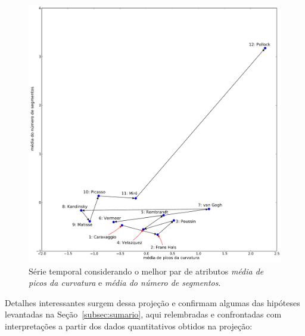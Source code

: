 \begin{figure}[h!]
\begin{center}
        \includegraphics[scale=.5]{figs/caso1_g2}
      \caption{Série temporal considerando o melhor par de atributos
        \emph{média de picos da curvatura} e \emph{média do número de
          segmentos}.}
        \label{fig:caso1_g2}
\end{center}
\end{figure}

Detalhes interessantes surgem dessa projeção e confirmam
algumas das hipóteses levantadas na Seção~\ref{subsec:sumario}, aqui
relembradas e confrontadas com interpretações a partir dos dados
quantitativos obtidos na projeção:

